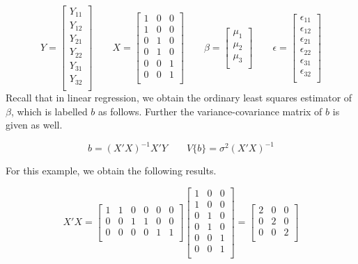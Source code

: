 \documentclass[
]{book}
\begin{document}
\[ 
Y = \begin{bmatrix}
Y_{11} \\ Y_{12} \\ Y_{21} \\ Y_{22} \\
Y_{31} \\ Y_{32} \\ \end{bmatrix}
\qquad 
X = \begin{bmatrix}
1 & 0 & 0 \\ 1 & 0 & 0 \\
0 & 1 & 0 \\ 0 & 1 & 0 \\
0 & 0 & 1 \\ 0 & 0 & 1 \\ \end{bmatrix}
\qquad
\beta = \begin{bmatrix}
\mu_1 \\ \mu_2 \\ \mu_3 \\ \end{bmatrix}
\qquad 
\epsilon = \begin{bmatrix}
\epsilon_{11} \\ \epsilon_{12} \\ \epsilon_{21} \\ \epsilon_{22} \\
\epsilon_{31} \\ \epsilon_{32} \\ \end{bmatrix}
\] Recall that in linear regression, we obtain the ordinary least
squares estimator of \(\beta\), which is labelled \(b\) as follows.
Further the variance-covariance matrix of \(b\) is given as well.

\[ b = \left(X'X\right)^{-1}X'Y \qquad V\{b\} = 
\sigma^2\left(X'X\right)^{-1} \]

For this example, we obtain the following results.

\[ 
X'X = 
\begin{bmatrix}
1 & 1 & 0 & 0 & 0 & 0 \\
0 & 0 & 1 & 1 & 0 & 0 \\
0 & 0 & 0 & 0 & 1 & 1 \\ \end{bmatrix}
\begin{bmatrix}
1 & 0 & 0 \\ 1 & 0 & 0 \\
0 & 1 & 0 \\ 0 & 1 & 0 \\
0 & 0 & 1 \\ 0 & 0 & 1 \\ \end{bmatrix}
= 
\begin{bmatrix}
2 & 0 & 0 \\ 0 & 2 & 0 \\ 0 & 0 & 2 \\ \end{bmatrix}
\]
\end{document}

